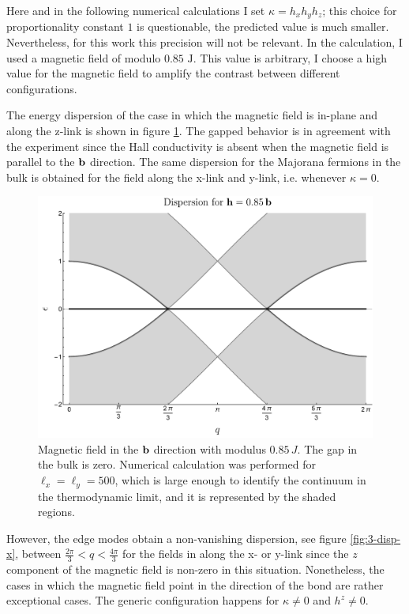  Here and in the following numerical calculations I set $\kappa = h_xh_yh_z$; this choice for proportionality constant $1$ is questionable, the predicted value is much smaller. Nevertheless, for this work this precision will not be relevant. In the calculation, I used a magnetic field of modulo $0.85 \text{ J}$. This value is arbitrary, I choose a high value for the magnetic field to amplify the contrast between different configurations. %


The energy dispersion of the case in which the magnetic field is in-plane and along the z-link is shown in figure \ref{fig:3-disp-b}. The gapped behavior is in agreement with the experiment \cite{yokoi2020halfinteger} since the Hall conductivity is absent when the magnetic field is parallel to the $\bf{b}$ direction. The same dispersion for the Majorana fermions in the bulk is obtained for the field along the x-link and y-link, i.e. whenever $\kappa =0$.
 \begin{figure}[h]
    \centering
    \includegraphics[width = 0.6 \textwidth]{images/CH3/disp_b.pdf}
    \caption{Magnetic field in the $\bf{b}$ direction with modulus $0.85 \, J$. The gap in the bulk is zero.  Numerical calculation was performed for $\ell_x = \ell_y = 500$, which is large enough to identify the continuum in the thermodynamic limit, and it is represented by the shaded regions. }
    \label{fig:3-disp-b}
\end{figure}
However, the edge modes obtain a non-vanishing dispersion, see figure \ref{fig:3-disp-x}, between $\frac{2\pi}{3} < q < \frac{4\pi}{3}$ for the fields in along the x- or y-link since the  $z$ component of the magnetic field is non-zero in this situation. Nonetheless, the cases in which the magnetic field point in the direction of the bond are rather exceptional cases. The generic configuration happens for $\kappa \neq 0$ and $h^z \neq 0$.

